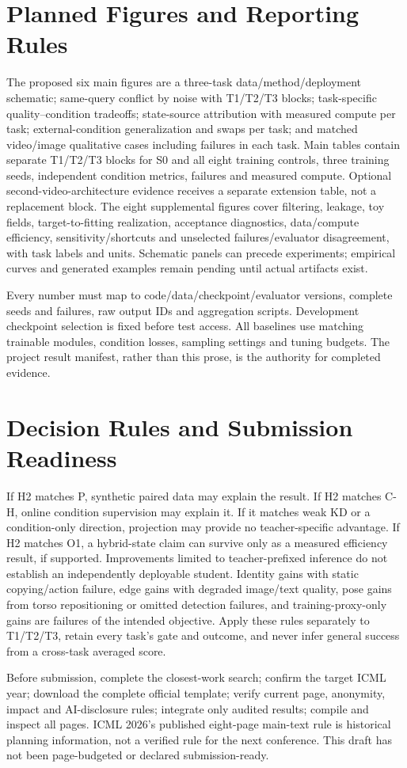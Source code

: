 \documentclass{article}
\begin{document}
\section{Planned Figures and Reporting Rules}
The proposed six main figures are a three-task data/method/deployment schematic; same-query conflict by noise with T1/T2/T3 blocks; task-specific quality--condition tradeoffs; state-source attribution with measured compute per task; external-condition generalization and swaps per task; and matched video/image qualitative cases including failures in each task. Main tables contain separate T1/T2/T3 blocks for S0 and all eight training controls, three training seeds, independent condition metrics, failures and measured compute. Optional second-video-architecture evidence receives a separate extension table, not a replacement block. The eight supplemental figures cover filtering, leakage, toy fields, target-to-fitting realization, acceptance diagnostics, data/compute efficiency, sensitivity/shortcuts and unselected failures/evaluator disagreement, with task labels and units. Schematic panels can precede experiments; empirical curves and generated examples remain pending until actual artifacts exist.

Every number must map to code/data/checkpoint/evaluator versions, complete seeds and failures, raw output IDs and aggregation scripts. Development checkpoint selection is fixed before test access. All baselines use matching trainable modules, condition losses, sampling settings and tuning budgets. The project result manifest, rather than this prose, is the authority for completed evidence.

\section{Decision Rules and Submission Readiness}
If H2 matches P, synthetic paired data may explain the result. If H2 matches C-H, online condition supervision may explain it. If it matches weak KD or a condition-only direction, projection may provide no teacher-specific advantage. If H2 matches O1, a hybrid-state claim can survive only as a measured efficiency result, if supported. Improvements limited to teacher-prefixed inference do not establish an independently deployable student. Identity gains with static copying/action failure, edge gains with degraded image/text quality, pose gains from torso repositioning or omitted detection failures, and training-proxy-only gains are failures of the intended objective. Apply these rules separately to T1/T2/T3, retain every task's gate and outcome, and never infer general success from a cross-task averaged score.

Before submission, complete the closest-work search; confirm the target ICML year; download the complete official template; verify current page, anonymity, impact and AI-disclosure rules; integrate only audited results; compile and inspect all pages. ICML 2026's published eight-page main-text rule is historical planning information, not a verified rule for the next conference. This draft has not been page-budgeted or declared submission-ready.
\end{document}
